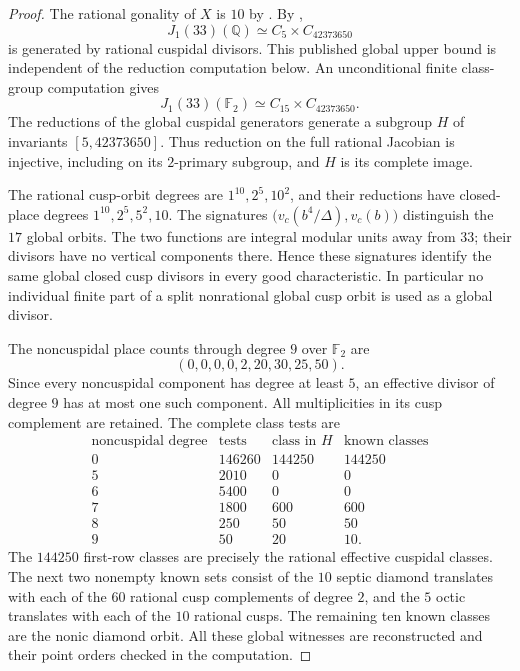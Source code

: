 \begin{proof}
The rational gonality of $X$ is $10$ by \cite[Table~1]{DvH}.
By \cite[Theorem~3.1(2), Theorem~4.13 and Table~2]{DEHMZ},
\[
 J_1(33)(\mathbb Q)\simeq C_5\times C_{42373650}
\]
is generated by rational cuspidal divisors. This published global
upper bound is independent of the reduction computation below.
An unconditional finite
class-group computation gives
\[
 J_1(33)(\mathbb F_2)\simeq C_{15}\times C_{42373650}.
\]
The reductions of the global cuspidal generators generate a subgroup
$H$ of invariants $[5,42373650]$. Thus reduction on the full rational
Jacobian is injective, including on its $2$-primary subgroup, and
$H$ is its complete image.

The rational cusp-orbit degrees are $1^{10},2^5,10^2$, and their
reductions have closed-place degrees $1^{10},2^5,5^2,10$.
The signatures
$\bigl(v_c(b^4/\Delta),v_c(b)\bigr)$ distinguish the $17$ global
orbits. The two functions are integral modular units away from $33$;
their divisors have no vertical components there. Hence these
signatures identify the same global closed cusp divisors in every
good characteristic. In particular no individual finite part of a
split nonrational global cusp orbit is used as a global divisor.

The noncuspidal place counts through degree $9$ over $\mathbb F_2$
are
\[
 (0,0,0,0,2,20,30,25,50).
\]
Since every noncuspidal component has degree at least $5$, an
effective divisor of degree $9$ has at most one such component.
All multiplicities in its cusp complement are retained.
The complete class tests are
\[
\begin{array}{c|r|r|r}
\text{noncuspidal degree}&\text{tests}&\text{class in }H&
 \text{known classes}\\\hline
0&146260&144250&144250\\
5&2010&0&0\\
6&5400&0&0\\
7&1800&600&600\\
8&250&50&50\\
9&50&20&10.
\end{array}
\]
The $144250$ first-row classes are precisely the rational effective
cuspidal classes. The next two nonempty known sets consist of the
$10$ septic diamond translates with each of the $60$ rational cusp
complements of degree $2$, and the $5$ octic translates with each of
the $10$ rational cusps. The remaining ten known classes are the
nonic diamond orbit. All these global witnesses are reconstructed
and their point orders checked in the computation.


\end{proof}
